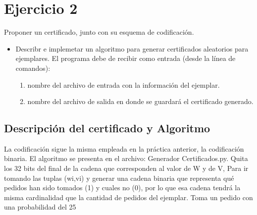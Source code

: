 \section{Ejercicio 2}

\begin{tcolorbox}[enunciado]
Proponer un certificado, junto con su esquema de codificación.
\begin{itemize}
    \item Describr e implemetar un algoritmo para generar certificados aleatorios para ejemplares. El programa debe de recibir como entrada (desde la línea de comandos):
    \begin{enumerate}
        \item nombre del archivo de entrada con la información del ejemplar.
        \item nombre del archivo de salida en donde se guardará el certificado generado.
    \end{enumerate}
\end{itemize}
\end{tcolorbox}

\subsection{Descripción del certificado y Algoritmo}
La codificación sigue la misma empleada en la práctica anterior, la codificación binaria. El algoritmo se presenta en el archivo: Generador Certificados.py. Quita los 32 bits del final de la cadena que corresponden al valor de W y de V, Para ir tomando las tuplas (wi,vi) y generar una cadena binaria que representa qué pedidos han sido tomados (1) y cuales no (0), por lo que esa cadena tendrá la misma cardinalidad que la cantidad de pedidos del ejemplar.
Toma un pedido con una probabilidad del 25%